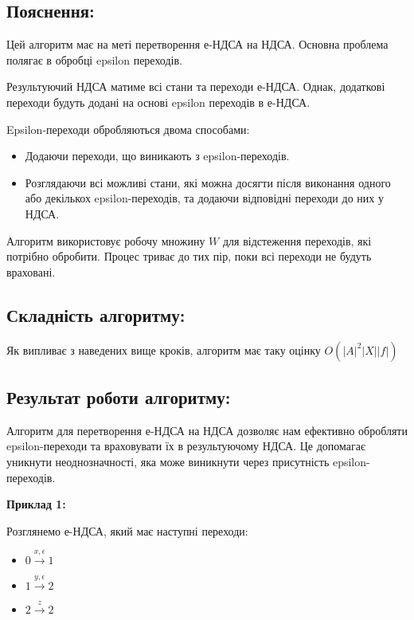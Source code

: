 \documentclass[12pt,a4paper]{article}
\begin{document}
\newpage

\subsection*{Пояснення:}

Цей алгоритм має на меті перетворення е-НДСА на НДСА. Основна проблема полягає в обробці epsilon переходів.

\vspace{0.5em}
Результуючий НДСА матиме всі стани та переходи е-НДСА. Однак, додаткові переходи будуть додані на основі epsilon переходів в е-НДСА.
\vspace{0.5em}

Epsilon-переходи обробляються двома способами:
\begin{itemize}
    \item Додаючи переходи, що виникають з epsilon-переходів.
    \item Розглядаючи всі можливі стани, які можна досягти після виконання одного або декількох epsilon-переходів, та додаючи відповідні переходи до них у НДСА.
\end{itemize}

Алгоритм використовує робочу множину \( W \) для відстеження переходів, які потрібно обробити. Процес триває до тих пір, поки всі переходи не будуть враховані.

\subsection*{Складність алгоритму:}
Як випливає з наведених вище кроків, алгоритм має таку оцінку \( O(|A|^2|X||f|) \)

\subsection*{Результат роботи алгоритму:}

Алгоритм для перетворення е-НДСА на НДСА дозволяє нам ефективно обробляти epsilon-переходи та враховувати їх в результуючому НДСА. Це допомагає уникнути неоднозначності, яка може виникнути через присутність epsilon-переходів.

\vspace{1em}
\textbf{Приклад 1:}
\vspace{0.5em}

Розглянемо е-НДСА, який має наступні переходи:
\begin{itemize}
    \item \(0 \xrightarrow{x, \epsilon} 1\)
    \item \(1 \xrightarrow{y, \epsilon} 2\)
    \item \(2 \xrightarrow{z} 2\)
\end{itemize}
\end{document}
